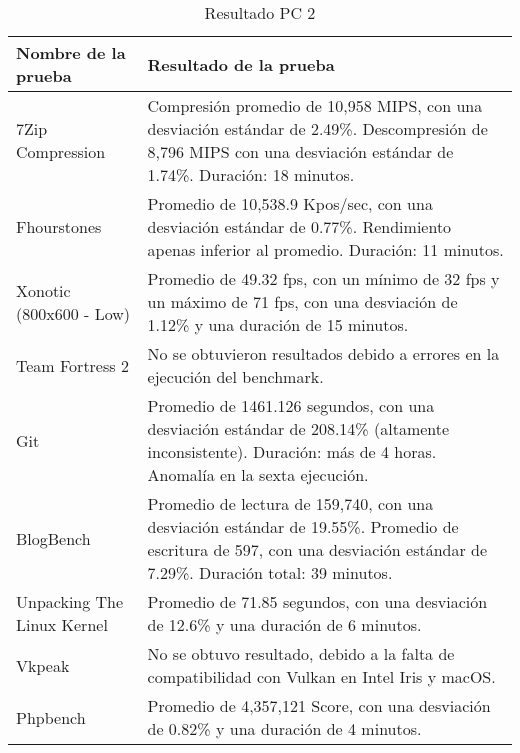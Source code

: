\documentclass[12pt]{article}
\begin{document}
\begin{table}[!htb]
    \centering
    \begin{tabular}{|p{4cm}|p{10cm}|}
        \hline
        \textbf{Nombre de la prueba} & \textbf{Resultado de la prueba} \\
        \hline
        7Zip Compression & Compresión promedio de 10,958 MIPS, con una desviación estándar de 2.49\%. Descompresión de 8,796 MIPS con una desviación estándar de 1.74\%. Duración: 18 minutos. \\
        \hline
        Fhourstones & Promedio de 10,538.9 Kpos/sec, con una desviación estándar de 0.77\%. Rendimiento apenas inferior al promedio. Duración: 11 minutos. \\
        \hline
        Xonotic (800x600 - Low) & Promedio de 49.32 fps, con un mínimo de 32 fps y un máximo de 71 fps, con una desviación de 1.12\% y una duración de 15 minutos. \\
        \hline
        Team Fortress 2 & No se obtuvieron resultados debido a errores en la ejecución del benchmark. \\
        \hline
        Git & Promedio de 1461.126 segundos, con una desviación estándar de 208.14\% (altamente inconsistente). Duración: más de 4 horas. Anomalía en la sexta ejecución. \\
        \hline
        BlogBench & Promedio de lectura de 159,740, con una desviación estándar de 19.55\%. Promedio de escritura de 597, con una desviación estándar de 7.29\%. Duración total: 39 minutos. \\
        \hline
        Unpacking The Linux Kernel & Promedio de 71.85 segundos, con una desviación de 12.6\% y una duración de 6 minutos. \\
        \hline
        Vkpeak & No se obtuvo resultado, debido a la falta de compatibilidad con Vulkan en Intel Iris y macOS. \\
        \hline
        Phpbench & Promedio de 4,357,121 Score, con una desviación de 0.82\% y una duración de 4 minutos.\\
        \hline
    \end{tabular}
    \caption{Resultado PC 2}
    \label{tab:resultados_pc2}
\end{table}
\end{document}
